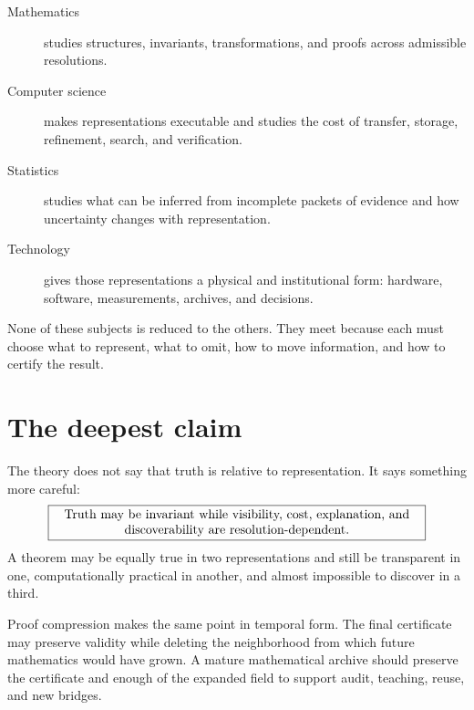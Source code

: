 \documentclass[11pt,oneside]{book}
\theoremstyle{remark}
\begin{document}
\begin{description}
\item[Mathematics] studies structures, invariants, transformations, and proofs across admissible resolutions.
\item[Computer science] makes representations executable and studies the cost of transfer, storage, refinement, search, and verification.
\item[Statistics] studies what can be inferred from incomplete packets of evidence and how uncertainty changes with representation.
\item[Technology] gives those representations a physical and institutional form: hardware, software, measurements, archives, and decisions.
\end{description}

None of these subjects is reduced to the others.  They meet because each must choose what to represent, what to omit, how to move information, and how to certify the result.

\section{The deepest claim}
The theory does not say that truth is relative to representation.  It says something more careful:
\[
\boxed{\begin{minipage}{0.84\linewidth}
\centering
Truth may be invariant while visibility, cost, explanation, and discoverability are resolution-dependent.
\end{minipage}}
\]
A theorem may be equally true in two representations and still be transparent in one, computationally practical in another, and almost impossible to discover in a third.

Proof compression makes the same point in temporal form.  The final certificate may preserve validity while deleting the neighborhood from which future mathematics would have grown.  A mature mathematical archive should preserve the certificate and enough of the expanded field to support audit, teaching, reuse, and new bridges.
\end{document}
